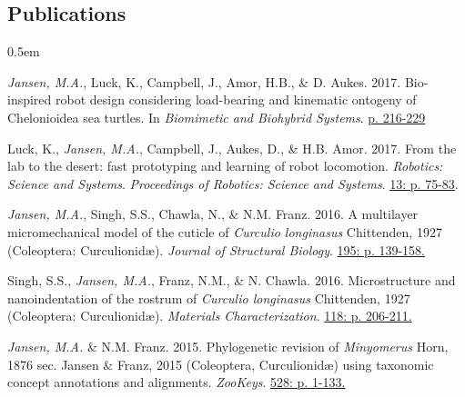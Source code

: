 \documentclass[11pt,a4paper]{extarticle}
\begin{document}
\subsection*{Publications}
		\begin{description}
		\itemsep0.5em
		\item \textit{Jansen, M.A.}, Luck, K., Campbell, J., Amor, H.B., \& D. Aukes. 2017. Bio-inspired robot design considering load-bearing and kinematic ontogeny of Chelonioidea sea turtles. In \textit{Biomimetic and Biohybrid Systems}. \href{http://www.springer.com/us/book/9783319635361}{p. 216-229}
		\item Luck, K., \textit{Jansen, M.A.}, Campbell, J., Aukes, D., \& H.B. Amor. 2017. From the lab to the desert: fast prototyping and learning of robot locomotion. \textit{Robotics: Science and Systems}. \textit{Proceedings of Robotics: Science and Systems}. \href{http://www.roboticsproceedings.org/rss13/p75.html}{13: p. 75-83}.
		\item \textit{Jansen, M.A.}, Singh, S.S., Chawla, N., \& N.M. Franz. 2016. A multilayer micromechanical model of the cuticle of \textit{Curculio longinasus} Chittenden, 1927 (Coleoptera: Curculionid\ae). \textit{Journal of Structural Biology}. \href{http://www.sciencedirect.com/science/article/pii/S1047847716300922}{195: p. 139-158.}
		\item Singh, S.S., \textit{Jansen, M.A.}, Franz, N.M., \& N. Chawla. 2016. Microstructure and nanoindentation of the rostrum of \textit{Curculio longinasus} Chittenden, 1927 (Coleoptera: Curculionid\ae). \textit{Materials Characterization}. \href{http://www.sciencedirect.com/science/article/pii/S1044580316301619}{118: p. 206-211.}
		\item \textit{Jansen, M.A.} \& N.M. Franz. 2015. Phylogenetic revision of \textit{Minyomerus} Horn, 1876 sec. Jansen \& Franz, 2015 (Coleoptera, Curculionid\ae) using taxonomic concept annotations and alignments. \textit{ZooKeys}. \href{http://zookeys.pensoft.net/articles.php?id=6001}{528: p. 1-133.}
	\end{description}
\end{document}
